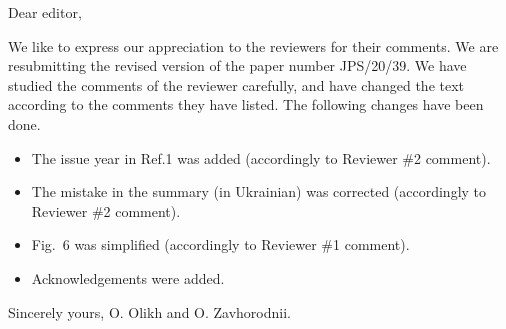 \documentclass[12pt]{article}
\begin{document}
Dear editor,

We like to express our appreciation to the reviewers for their comments.
We are resubmitting the revised version of the paper number  JPS/20/39.
We have studied the comments of the reviewer carefully, and have changed the text according to the comments they
have listed.
The following changes have been done.

\begin{itemize}
  \item The issue year in Ref.1 was added (accordingly to Reviewer \#2 comment).	
  \item The mistake in the summary (in Ukrainian) was corrected (accordingly to Reviewer \#2 comment).
  \item Fig.~6 was simplified (accordingly to Reviewer \#1 comment).
  \item Acknowledgements were added.
\end{itemize}

Sincerely yours,
O. Olikh and O. Zavhorodnii.
\end{document}
